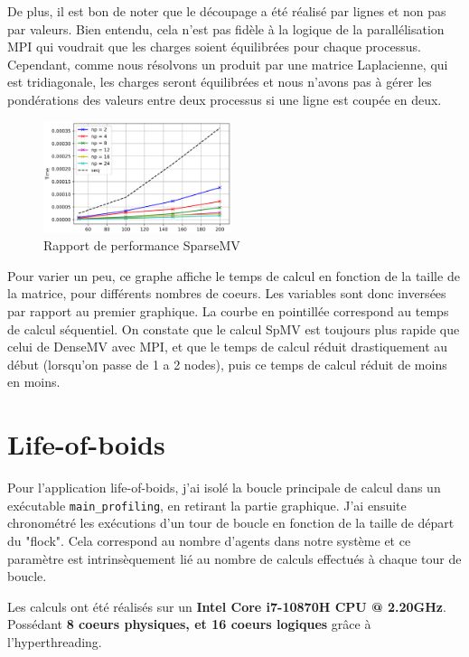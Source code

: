 \documentclass[10pt,twocolumn,letterpaper]{article}
\def\code#1{\texttt{#1}}
\begin{document}
De plus, il est bon de noter que le découpage a été réalisé par lignes et non pas par valeurs. 
Bien entendu, cela n'est pas fidèle à la logique de la parallélisation MPI qui voudrait que les charges soient équilibrées pour chaque processus.
Cependant, comme nous résolvons un produit par une matrice Laplacienne, qui est tridiagonale, 
les charges seront équilibrées et nous n'avons pas à gérer les pondérations des valeurs entre deux processus si une ligne est coupée en deux.

\begin{figure}[H]
  \centering
  \caption{Rapport de performance SparseMV}
  \includegraphics[width=0.49\textwidth]{figures/spmv_benchmark.png}
\end{figure}

Pour varier un peu, ce graphe affiche le temps de calcul en fonction de la taille de la matrice, pour
différents nombres de coeurs.
Les variables sont donc inversées par rapport au premier graphique. 
La courbe en pointillée correspond au temps de calcul séquentiel. 
On constate que le calcul SpMV est toujours plus rapide que celui de DenseMV avec MPI, et que le temps de calcul réduit drastiquement au début
(lorsqu'on passe de 1 a 2 nodes), puis ce temps de calcul réduit de moins en moins.

\section{Life-of-boids}

Pour l'application life-of-boids, j'ai isolé la boucle principale de calcul dans un exécutable \code{main\_profiling}, en retirant la partie graphique.
J'ai ensuite chronométré les exécutions d'un tour de boucle en fonction de la taille de départ du "flock".
Cela correspond au nombre d'agents dans notre système et ce paramètre est intrinsèquement lié au nombre de calculs effectués à chaque tour de boucle.

Les calculs ont été réalisés sur un \textbf{Intel Core i7-10870H CPU @ 2.20GHz}. Possédant \textbf{8 coeurs physiques, et 16 coeurs logiques} grâce à l'hyperthreading.
\end{document}
